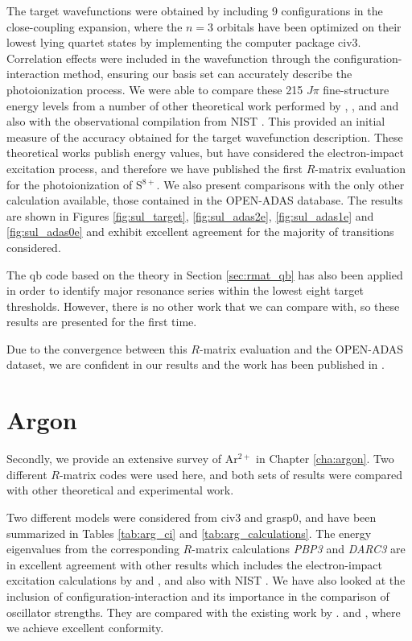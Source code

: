 The target wavefunctions were obtained by including 9 configurations in the close-coupling expansion, where the $n=3$ orbitals have been optimized on their lowest lying quartet states by implementing the computer package {\sc civ3}. Correlation effects were included in the wavefunction through the configuration-interaction method, ensuring our basis set can accurately describe the photoionization process. We were able to compare these 215 $J\pi$ fine-structure energy levels from a number of other theoretical work performed by \citet{0004-637X-762-1-53}, \citet{2003ADNDT..85..169B}, and \citet{2004ADNDT..87....1F} and also with the observational compilation from NIST \citep{1990JPCRD..19..821M}. This provided an initial measure of the accuracy obtained for the target wavefunction description. These theoretical works publish energy values, but have considered the electron-impact excitation process, and therefore we have published the first $R$-matrix evaluation for the photoionization of S$^{8+}$. We also present comparisons with the only other calculation available, those contained in the OPEN-ADAS database. The results are shown in Figures \ref{fig:sul_target}, \ref{fig:sul_adas2e}, \ref{fig:sul_adas1e} and \ref{fig:sul_adas0e} and exhibit excellent agreement for the majority of transitions considered.

The {\sc qb} code based on the theory in Section \ref{sec:rmat_qb} has also been applied in order to identify major resonance series within the lowest eight target thresholds. However, there is no other work that we can compare with, so these results are presented for the first time.
 
Due to the convergence between this $R$-matrix evaluation and the OPEN-ADAS dataset, we are confident in our results and the work has been published in \citet{2015JPhB...48o5204T}.

\section{Argon}
Secondly, we provide an extensive survey of Ar$^{2+}$ in Chapter \ref{cha:argon}. Two different $R$-matrix codes were used here, and both sets of results were compared with other theoretical and experimental work. 

Two different models were considered from {\sc civ3} and {\sc grasp0}, and have been summarized in Tables \ref{tab:arg_ci} and \ref{tab:arg_calculations}. The energy eigenvalues from the corresponding $R$-matrix calculations \textit{PBP3} and \textit{DARC3} are in excellent agreement with other results which includes the electron-impact excitation calculations by \citet{2009A&A...500.1253M} and \citet{2012EPJD...66...84S}, and also with NIST \citep{2010JPCRD..39c3101S}. We have also looked at the inclusion of configuration-interaction and its importance in the comparison of oscillator strengths. They are compared with the existing work by \citet{2006ADNDT..92..607F}. and \citet{2001JQSRT..69..171L}, where we achieve excellent conformity.

